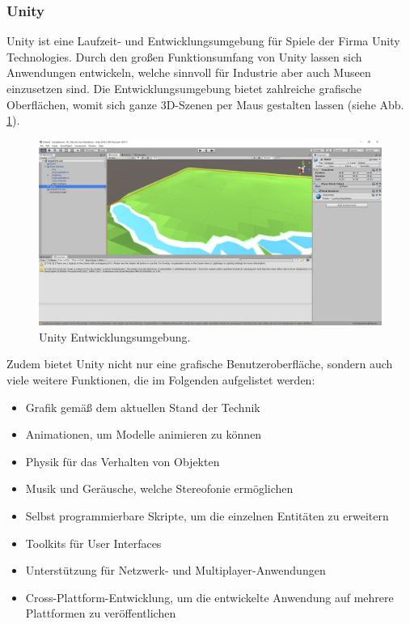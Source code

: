 \documentclass[a4paper,12pt,oneside]{article}
\begin{document}
      \subsubsection{Unity}
        Unity ist eine Laufzeit- und Entwicklungsumgebung für Spiele der Firma Unity
        Technologies. Durch den großen Funktionsumfang von Unity lassen sich
        Anwendungen entwickeln, welche sinnvoll für Industrie aber auch Museen 
        einzusetzen sind.
        Die Entwicklungsumgebung bietet zahlreiche grafische Oberflächen, womit sich ganze
        3D-Szenen per Maus gestalten lassen (siehe Abb. \ref{fig:unity1}). 
        \begin{figure}[t]
          \centering
          \includegraphics[scale=0.3]{img/unity1.png}
          \caption{Unity Entwicklungsumgebung.}
          \label{fig:unity1}
        \end{figure}
        Zudem bietet Unity nicht nur eine grafische Benutzeroberfläche, 
        sondern auch viele weitere Funktionen, die im Folgenden aufgelistet werden:
        \begin{itemize}
          \item Grafik gemäß dem aktuellen Stand der Technik
          \item Animationen, um Modelle animieren zu können
          \item Physik für das Verhalten von Objekten
          \item Musik und Geräusche, welche Stereofonie ermöglichen
          \item Selbst programmierbare Skripte, um die einzelnen Entitäten zu erweitern
          \item Toolkits für User Interfaces
          \item Unterstützung für Netzwerk- und Multiplayer-Anwendungen
          \item Cross-Plattform-Entwicklung, um die entwickelte Anwendung auf mehrere
          Plattformen zu veröffentlichen
        \end{itemize}
\end{document}

